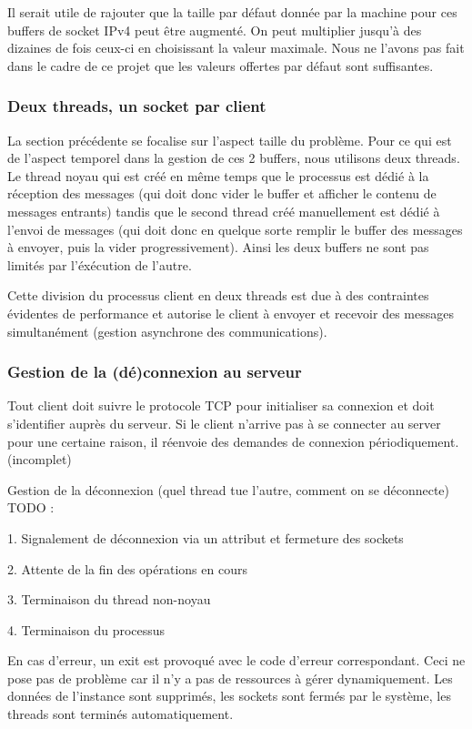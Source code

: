 \documentclass{article}
\begin{document}
Il serait utile de rajouter que la taille par défaut donnée par la machine pour ces buffers de socket IPv4 peut être augmenté. On peut multiplier jusqu'à des dizaines de fois ceux-ci en choisissant la valeur maximale. Nous ne l'avons pas fait dans le cadre de ce projet que les valeurs offertes par défaut sont suffisantes.



\subsubsection{Deux threads, un socket par client}
 La section précédente se focalise sur l'aspect taille du problème. Pour ce qui est de l'aspect temporel dans la gestion de ces 2 buffers, nous utilisons deux threads. Le thread noyau qui est créé en même temps que le processus est dédié à la réception des messages (qui doit donc vider le buffer et afficher le contenu de messages entrants) tandis que le second thread créé manuellement est dédié à l'envoi de messages (qui doit donc en quelque sorte remplir le buffer des messages à envoyer, puis la vider progressivement). Ainsi les deux buffers ne sont pas limités par l'éxécution de l'autre.

 \noindent Cette division du processus client en deux threads est due à des contraintes évidentes de performance et autorise le client à envoyer et recevoir des messages simultanément (gestion asynchrone des communications).



\subsubsection{Gestion de la (dé)connexion au serveur}
\noindent Tout client doit suivre le protocole TCP \cite{TCP-IP} pour initialiser sa connexion et doit s'identifier auprès du serveur. Si le client n'arrive pas à se connecter au server pour une certaine raison, il réenvoie des demandes de connexion périodiquement.
(incomplet)


 Gestion de la déconnexion (quel thread tue l'autre, comment on se déconnecte) TODO :

1. Signalement de déconnexion via un attribut et fermeture des sockets

2. Attente de la fin des opérations en cours

3. Terminaison du thread non-noyau

4. Terminaison du processus

En cas d'erreur, un exit est provoqué avec le code d'erreur correspondant. Ceci ne pose pas de problème car il n'y a pas de ressources à gérer dynamiquement. Les données de l'instance sont supprimés, les sockets sont fermés par le système, les threads sont terminés automatiquement.
\end{document}
